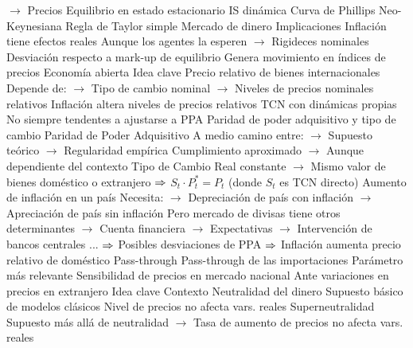 \documentclass{nuevotema}
\begin{document}
\begin{esquemal}
				\4[] $\to$ Precios
				\4 Equilibrio en estado estacionario
				\4[DIS] IS dinámica
				\4[] 
				\4[NKPC] Curva de Phillips Neo-Keynesiana
				\4[] 
				\4[TR] Regla de Taylor simple
				\4[] 
				\4[MP] Mercado de dinero
				\4[] 
			\3 Implicaciones
				\4 Inflación tiene efectos reales
				\4[] Aunque los agentes la esperen
				\4[] $\to$ Rigideces nominales
				\4 Desviación respecto a mark-up de equilibrio
				\4[] Genera movimiento en índices de precios
		\2 Economía abierta
			\3 Idea clave
				\4 Precio relativo de bienes internacionales
				\4[] Depende de:
				\4[] $\to$ Tipo de cambio nominal
				\4[] $\to$ Niveles de precios nominales relativos
				\4 Inflación altera niveles de precios relativos
				\4 TCN con dinámicas propias
				\4[] No siempre tendentes a ajustarse a PPA
			\3 Paridad de poder adquisitivo y tipo de cambio
				\4 Paridad de Poder Adquisitivo
				\4[] A medio camino entre:
				\4[] $\to$ Supuesto teórico
				\4[] $\to$ Regularidad empírica
				\4[] Cumplimiento aproximado
				\4[] $\to$ Aunque dependiente del contexto
				\4[] Tipo de Cambio Real constante
				\4[] $\to$ Mismo valor de bienes doméstico o extranjero
				\4[] $\Rightarrow$ $S_t \cdot P^*_t = P_t$
				\4[] (donde $S_t$ es TCN directo)
				\4 Aumento de inflación en un país
				\4[] Necesita:
				\4[] $\to$ Depreciación de país con inflación
				\4[] $\to$ Apreciación de país sin inflación
				\4[] Pero mercado de divisas tiene otros determinantes
				\4[] $\to$ Cuenta financiera
				\4[] $\to$ Expectativas
				\4[] $\to$ Intervención de bancos centrales
				\4[] ...
				\4[] $\Rightarrow$ Posibles desviaciones de PPA
				\4[] $\Rightarrow$ Inflación aumenta precio relativo de doméstico
			\3 Pass-through
				\4 Pass-through de las importaciones
				\4[] Parámetro más relevante
				\4 Sensibilidad de precios en mercado nacional
				\4[] Ante variaciones en precios en extranjero
	\1 
		\2 Idea clave
			\3 Contexto
				\4 Neutralidad del dinero
				\4[] Supuesto básico de modelos clásicos
				\4[] Nivel de precios no afecta vars. reales
				\4 Superneutralidad
				\4[] Supuesto más allá de neutralidad
				\4[] $\to$ Tasa de aumento de precios no afecta vars. reales

\end{esquemal}
\end{document}
